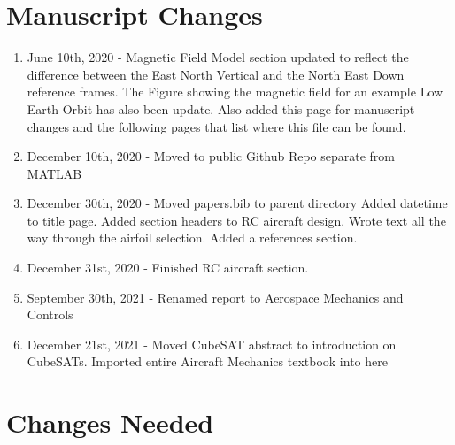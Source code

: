 \documentclass{article}
\begin{document}
\section*{Manuscript Changes}

\begin{enumerate}[itemsep=-5pt]
\item June 10th, 2020 - Magnetic Field Model section updated to
  reflect the difference between the East North Vertical and the North
  East Down reference frames. The Figure showing the magnetic field
  for an example Low Earth Orbit has also been update. Also added this
  page for manuscript changes and the following pages that list where
  this file can be found.
\item December 10th, 2020 - Moved to public Github Repo separate from
  MATLAB
\item December 30th, 2020 - Moved papers.bib to parent directory Added
  datetime to title page. Added  section headers to RC aircraft
  design. Wrote text all the way through the airfoil selection. Added
  a references section.
\item December 31st, 2020 - Finished RC aircraft section.
\item September 30th, 2021 - Renamed report to Aerospace Mechanics and
  Controls
\item December 21st, 2021 - Moved CubeSAT abstract to introduction on
  CubeSATs. Imported entire Aircraft Mechanics textbook into here
\end{enumerate}

\section*{Changes Needed}
\end{document}
